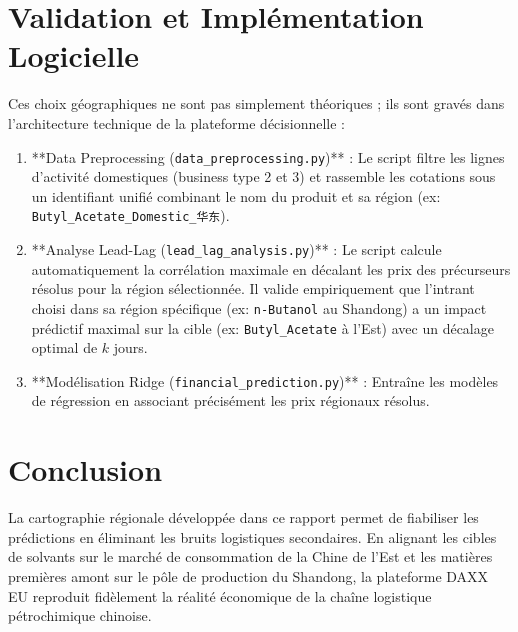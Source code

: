 \documentclass[12pt,a4paper]{article}
\begin{document}
\section{Validation et Implémentation Logicielle}
Ces choix géographiques ne sont pas simplement théoriques ; ils sont gravés dans l'architecture technique de la plateforme décisionnelle :

\begin{enumerate}
    \item **Data Preprocessing (\texttt{data\_preprocessing.py})** : Le script filtre les lignes d'activité domestiques (business type 2 et 3) et rassemble les cotations sous un identifiant unifié combinant le nom du produit et sa région (ex: \texttt{Butyl\_Acetate\_Domestic\_华东}).
    \item **Analyse Lead-Lag (\texttt{lead\_lag\_analysis.py})** : Le script calcule automatiquement la corrélation maximale en décalant les prix des précurseurs résolus pour la région sélectionnée. Il valide empiriquement que l'intrant choisi dans sa région spécifique (ex: \texttt{n-Butanol} au Shandong) a un impact prédictif maximal sur la cible (ex: \texttt{Butyl\_Acetate} à l'Est) avec un décalage optimal de $k$ jours.
    \item **Modélisation Ridge (\texttt{financial\_prediction.py})** : Entraîne les modèles de régression en associant précisément les prix régionaux résolus.
\end{enumerate}

\section{Conclusion}
La cartographie régionale développée dans ce rapport permet de fiabiliser les prédictions en éliminant les bruits logistiques secondaires. En alignant les cibles de solvants sur le marché de consommation de la Chine de l'Est et les matières premières amont sur le pôle de production du Shandong, la plateforme DAXX EU reproduit fidèlement la réalité économique de la chaîne logistique pétrochimique chinoise.
\end{document}
